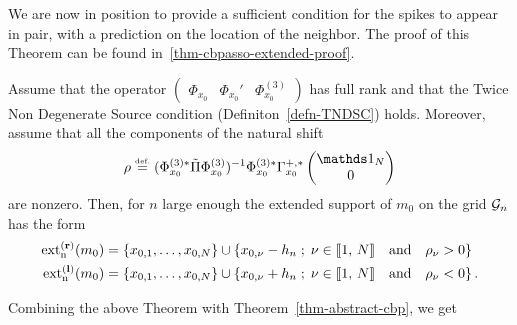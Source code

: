 We are now in position to provide a sufficient condition for the spikes to appear in pair, with a prediction on the location of the neighbor. 
%
The proof of this Theorem can be found in~\ref{thm-cbpasso-extended-proof}.
\begin{thm}\label{thm-cbpasso-extended}
  Assume that the operator $\begin{pmatrix}\Phi_{x_0}&\Phi_{x_0}'&\Phi_{x_0}^{(3)}\end{pmatrix}$ has full rank and that the Twice Non Degenerate Source condition (Definiton~\ref{defn-TNDSC}) holds.
  Moreover, assume that all the components of the natural shift
  \begin{align}
    \rho \eqdef  (\Phi_{x_0}^{(3)*}\projGam\Phi_{x_0}^{(3)})^{-1}\Phi_{x_0}^{(3)*}\Gamma_{x_0}^{+,*}\begin{pmatrix}
      \bun_{N}\\0
    \end{pmatrix}
  \end{align}
  are nonzero.
  Then, for $n$ large enough the extended support of $m_0$ on the grid $\mathcal{G}_n$ has the form
  \begin{align*}
    \operatorname{ext_n^{\mathbf{(r)}}}(m_0) &=\{x_{0,1},\ldots, x_{0,N}\}\cup \left\{ x_{0,\nu}-{h_n} \;;\; \nu\in\llbracket 1,\,N \rrbracket\quad \text{and} \quad \rho_\nu>0 \right\} \\
    \operatorname{ext_n^{\mathbf{(l)}}}(m_0) &=\{x_{0,1},\ldots, x_{0,N}\}\cup \left\{ x_{0,\nu}+{h_n} \;;\; \nu\in\llbracket 1,\,N \rrbracket\quad \text{and} \quad \rho_\nu<0 \right\}.
  \end{align*}
\end{thm}
Combining the above Theorem with Theorem~\ref{thm-abstract-cbp}, we get

